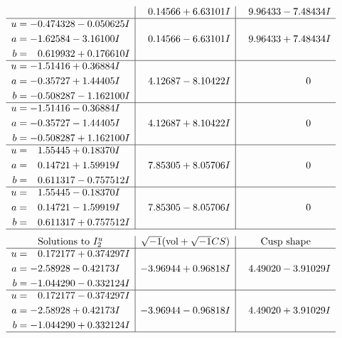 \documentclass[1p]{elsarticle_modified}
\theoremstyle{definition}
\newcommand{\I}{\sqrt{-1}}
\begin{document}
$$\begin{array}{c|c|c}
 & \phantom{-}0.14566 + 6.63101 I & \phantom{-}9.96433 - 7.48434 I \\ \hline\begin{aligned}
u &= -0.474328 - 0.050625 I \\
a &= -1.62584 - 3.16100 I \\
b &= \phantom{-}0.619932 + 0.176610 I\end{aligned}
 & \phantom{-}0.14566 - 6.63101 I & \phantom{-}9.96433 + 7.48434 I \\ \hline\begin{aligned}
u &= -1.51416 + 0.36884 I \\
a &= -0.35727 + 1.44405 I \\
b &= -0.508287 - 1.162100 I\end{aligned}
 & \phantom{-}4.12687 - 8.10422 I & \phantom{-0.000000 } 0 \\ \hline\begin{aligned}
u &= -1.51416 - 0.36884 I \\
a &= -0.35727 - 1.44405 I \\
b &= -0.508287 + 1.162100 I\end{aligned}
 & \phantom{-}4.12687 + 8.10422 I & \phantom{-0.000000 } 0 \\ \hline\begin{aligned}
u &= \phantom{-}1.55445 + 0.18370 I \\
a &= \phantom{-}0.14721 + 1.59919 I \\
b &= \phantom{-}0.611317 - 0.757512 I\end{aligned}
 & \phantom{-}7.85305 + 8.05706 I & \phantom{-0.000000 } 0 \\ \hline\begin{aligned}
u &= \phantom{-}1.55445 - 0.18370 I \\
a &= \phantom{-}0.14721 - 1.59919 I \\
b &= \phantom{-}0.611317 + 0.757512 I\end{aligned}
 & \phantom{-}7.85305 - 8.05706 I & \phantom{-0.000000 } 0\\
 \hline 
 \end{array}$$\newpage$$\begin{array}{c|c|c}  
\text{Solutions to }I^u_{2}& \I (\text{vol} + \sqrt{-1}CS) & \text{Cusp shape}\\
 \hline 
\begin{aligned}
u &= \phantom{-}0.172177 + 0.374297 I \\
a &= -2.58928 - 0.42173 I \\
b &= -1.044290 - 0.332124 I\end{aligned}
 & -3.96944 + 0.96818 I & \phantom{-}4.49020 - 3.91029 I \\ \hline\begin{aligned}
u &= \phantom{-}0.172177 - 0.374297 I \\
a &= -2.58928 + 0.42173 I \\
b &= -1.044290 + 0.332124 I\end{aligned}
 & -3.96944 - 0.96818 I & \phantom{-}4.49020 + 3.91029 I\\
 \hline 
 \end{array}$$\newpage
\end{document}
